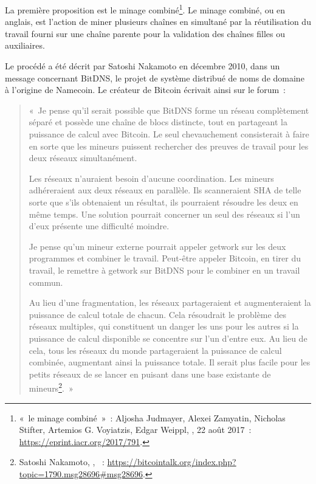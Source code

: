 
La première proposition est le minage combiné\footnote{«~le minage combiné~»~: Aljosha Judmayer, Alexei Zamyatin, Nicholas Stifter, Artemios G.  Voyiatzis, Edgar Weippl, , 22 août 2017~: \url{https://eprint.iacr.org/2017/791}.}. Le minage combiné, ou  en anglais, est l'action de miner plusieurs chaînes en simultané par la réutilisation du travail fourni sur une chaîne parente pour la validation des chaînes filles ou auxiliaires.

Le procédé a été décrit par Satoshi Nakamoto en décembre 2010, dans un message concernant BitDNS, le projet de système distribué de noms de domaine à l'origine de Namecoin. Le créateur de Bitcoin écrivait ainsi sur le forum~:

\begin{quote}
«~Je pense qu'il serait possible que BitDNS forme un réseau complètement séparé et possède une chaîne de blocs distincte, tout en partageant la puissance de calcul avec Bitcoin. Le seul chevauchement consisterait à faire en sorte que les mineurs puissent rechercher des preuves de travail pour les deux réseaux simultanément.

Les réseaux n'auraient besoin d'aucune coordination. Les mineurs adhéreraient aux deux réseaux en parallèle. Ils scanneraient SHA de telle sorte que s'ils obtenaient un résultat, ils pourraient résoudre les deux en même temps. Une solution pourrait concerner un seul des réseaux si l'un d'eux présente une difficulté moindre.

Je pense qu'un mineur externe pourrait appeler getwork sur les deux programmes et combiner le travail. Peut-être appeler Bitcoin, en tirer du travail, le remettre à getwork sur BitDNS pour le combiner en un travail commun.

Au lieu d'une fragmentation, les réseaux partageraient et augmenteraient la puissance de calcul totale de chacun. Cela résoudrait le problème des réseaux multiples, qui constituent un danger les uns pour les autres si la puissance de calcul disponible se concentre sur l'un d'entre eux. Au lieu de cela, tous les réseaux du monde partageraient la puissance de calcul combinée, augmentant ainsi la puissance totale. Il serait plus facile pour les petits réseaux de se lancer en puisant dans une base existante de mineurs\footnote{Satoshi Nakamoto, , ~: \url{https://bitcointalk.org/index.php?topic=1790.msg28696\#msg28696}.}.~»
\end{quote}

